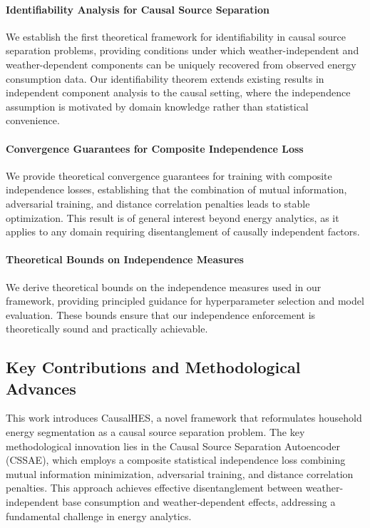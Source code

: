 \documentclass[journal]{IEEEtran}
\begin{document}
\paragraph{Identifiability Analysis for Causal Source Separation}
We establish the first theoretical framework for identifiability in causal source separation problems, providing conditions under which weather-independent and weather-dependent components can be uniquely recovered from observed energy consumption data. Our identifiability theorem extends existing results in independent component analysis to the causal setting, where the independence assumption is motivated by domain knowledge rather than statistical convenience.

\paragraph{Convergence Guarantees for Composite Independence Loss}
We provide theoretical convergence guarantees for training with composite independence losses, establishing that the combination of mutual information, adversarial training, and distance correlation penalties leads to stable optimization. This result is of general interest beyond energy analytics, as it applies to any domain requiring disentanglement of causally independent factors.

\paragraph{Theoretical Bounds on Independence Measures}
We derive theoretical bounds on the independence measures used in our framework, providing principled guidance for hyperparameter selection and model evaluation. These bounds ensure that our independence enforcement is theoretically sound and practically achievable.

\subsection{Key Contributions and Methodological Advances}
This work introduces CausalHES, a novel framework that reformulates household energy segmentation as a causal source separation problem. The key methodological innovation lies in the Causal Source Separation Autoencoder (CSSAE), which employs a composite statistical independence loss combining mutual information minimization, adversarial training, and distance correlation penalties. This approach achieves effective disentanglement between weather-independent base consumption and weather-dependent effects, addressing a fundamental challenge in energy analytics.
\end{document}
